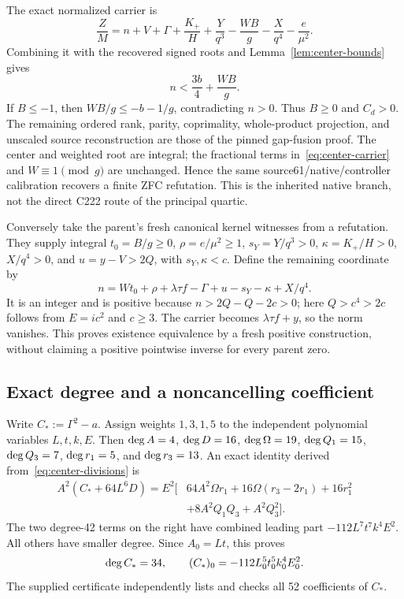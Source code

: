 The exact normalized carrier is
\begin{equation}\label{eq:center-carrier}
 \frac ZM=n+V+\Gamma+\frac{K_+}{H}+\frac Y{q^3}
          -\frac{WB}{g}-\frac X{q^4}-\frac e{\mu^2}.
\end{equation}
Combining it with the recovered signed roots and
Lemma~\ref{lem:center-bounds} gives
\[
 n<\frac{3b}{4}+\frac{WB}{g}.
\]
If $B\le-1$, then $WB/g\le-b-1/g$, contradicting $n>0$.
Thus $B\ge0$ and $C_d>0$.  The remaining ordered rank, parity,
coprimality, whole-product projection, and unscaled source reconstruction
are those of the pinned gap-fusion proof.  The center and weighted root
are integral; the fractional terms in~\eqref{eq:center-carrier} and
$W\equiv1\pmod g$ are unchanged.  Hence the same source61/native/controller
calibration recovers a finite ZFC refutation.  This is the inherited
native branch, not the direct C222 route of the principal quartic.

Conversely take the parent's fresh canonical kernel witnesses from a
refutation.  They supply integral $t_0=B/g\ge0$, $\rho=e/\mu^2\ge1$,
$s_Y=Y/q^3>0$, $\kappa=K_+/H>0$, $X/q^4>0$, and
$u=y-V>2Q$, with $s_Y,\kappa<c$.  Define the remaining coordinate by
\begin{equation}\label{eq:center-complete}
 n=Wt_0+\rho+\lambda\tau f-\Gamma+u-s_Y-\kappa+X/q^4.
\end{equation}
It is an integer and is positive because
$n>2Q-Q-2c>0$; here $Q>c^4>2c$ follows from $E=ic^2$ and $c\ge3$.
The carrier becomes $\lambda\tau f+y$, so the norm vanishes.
This proves existence equivalence by a fresh positive construction,
without claiming a positive pointwise inverse for every parent zero.

\subsection{Exact degree and a noncancelling coefficient}

Write $C_*:=\Gamma^2-a$.  Assign weights $1,3,1,5$ to the independent
polynomial variables $L,t,k,E$.  Then
$\operatorname{deg} A=4$, $\operatorname{deg} D=16$, $\operatorname{deg}\Omega=19$,
$\operatorname{deg} Q_1=15$, $\operatorname{deg} Q_3=7$, $\operatorname{deg} r_1=5$, and $\operatorname{deg} r_3=13$.
An exact identity derived from~\eqref{eq:center-divisions} is
\begin{equation}\label{eq:center-defect}
 \begin{aligned}
 A^2(C_*+64L^6D)=E^2\bigl[&64A^2\Omega r_1
       +16\Omega(r_3-2r_1)+16r_1^2\\
       &+8A^2Q_1Q_3+A^2Q_3^2\bigr].
 \end{aligned}
\end{equation}
The two degree-42 terms on the right have combined leading part
$-112L^7t^7k^4E^2$.  All others have smaller degree.
Since $A_0=Lt$, this proves
\begin{equation}\label{eq:center-defect-leading}
 \operatorname{deg} C_*=34,\qquad (C_*)_0=-112L_0^5t_0^5k_0^4E_0^2.
\end{equation}
The supplied certificate independently lists and checks all 52
coefficients of $C_*$.

